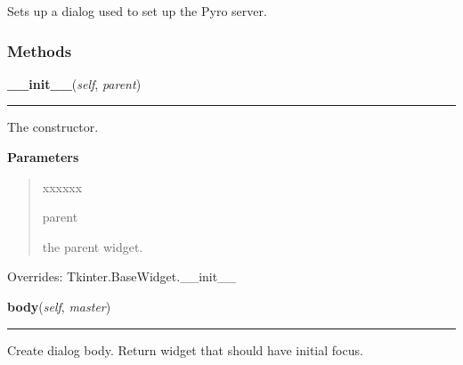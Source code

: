 Sets up a dialog used to set up the Pyro server.



  \subsubsection{Methods}

    \vspace{0.5ex}

\hspace{.8\funcindent}\begin{boxedminipage}{\funcwidth}

    \raggedright \textbf{\_\_init\_\_}(\textit{self}, \textit{parent})

    \vspace{-1.5ex}

    \rule{\textwidth}{0.5\fboxrule}
\setlength{\parskip}{2ex}
    The constructor.

\setlength{\parskip}{1ex}
      \textbf{Parameters}
      \vspace{-1ex}

      \begin{quote}
        \begin{Ventry}{xxxxxx}

          \item[parent]

          the parent widget.

        \end{Ventry}

      \end{quote}

      Overrides: Tkinter.BaseWidget.\_\_init\_\_

    \end{boxedminipage}

    \label{nMOLDYN:GUI:PyroServerDialog:PyroServerDialog:body}

    \vspace{0.5ex}

\hspace{.8\funcindent}\begin{boxedminipage}{\funcwidth}

    \raggedright \textbf{body}(\textit{self}, \textit{master})

    \vspace{-1.5ex}

    \rule{\textwidth}{0.5\fboxrule}
\setlength{\parskip}{2ex}
    Create dialog body. Return widget that should have initial focus.

\setlength{\parskip}{1ex}
    \end{boxedminipage}

